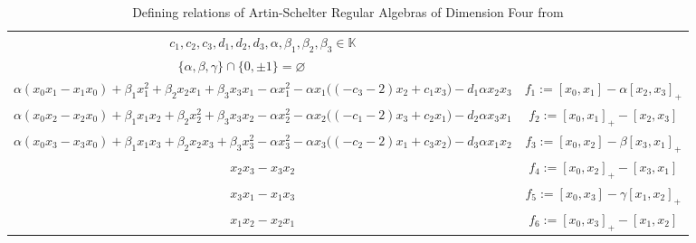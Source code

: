 \documentclass{amsart}
\begin{document}
\begin{table}[H]
{{\begin{tabular}{|c|c|c|}
\multicolumn{2}{|c|}{\small $c_1,c_2,c_3,d_1,d_2,d_3,\alpha, \beta_1, \beta_2, \beta_3 \in \mathbb{K}$}  & 
\shortstack{$\alpha, \beta, \gamma \in \mathbb{K},\ \alpha+ \beta + \gamma +\alpha\beta\gamma = 0,$\\
$\{\alpha, \beta, \gamma\} \cap \{0, \pm1\} = \varnothing$} \\
\hline
\multicolumn{2}{|c|}{\footnotesize $\alpha(x_0 x_1 - x_1 x_0) + \beta_1 x_1^2 + \beta_2 x_2 x_1 + \beta_3 x_3 x_1 
- \alpha x_1^2 - \alpha x_1 \big( (-c_3 - 2)x_2 + c_1 x_3 \big) - d_1 \alpha x_2 x_3 $} & $f_1 := [x_0, x_1] - \alpha [x_2, x_3]_+$ \\
\multicolumn{2}{|c|}{\footnotesize $\alpha(x_0 x_2 - x_2 x_0) + \beta_1 x_1 x_2 + \beta_2 x_2^2 + \beta_3 x_3 x_2 
- \alpha x_2^2 - \alpha x_2 \big( (-c_1 - 2)x_3 + c_2 x_1 \big) - d_2 \alpha x_3 x_1$} & $f_2 := [x_0, x_1]_+ - [x_2, x_3]$ \\
\multicolumn{2}{|c|}{\footnotesize $\alpha(x_0 x_3 - x_3 x_0) + \beta_1 x_1 x_3 + \beta_2 x_2 x_3 + \beta_3 x_3^2 
- \alpha x_3^2 - \alpha x_3 \big( (-c_2 - 2)x_1 + c_3 x_2 \big) - d_3 \alpha x_1 x_2$} & $f_3 := [x_0, x_2] - \beta [x_3, x_1]_+$ \\
\multicolumn{2}{|c|}{$x_2 x_3 - x_3 x_2$} & $f_4 := [x_0, x_2]_+ - [x_3, x_1]$ \\
\multicolumn{2}{|c|}{$x_3 x_1 - x_1 x_3$} & $f_5 := [x_0, x_3] - \gamma [x_1, x_2]_+$ \\
\multicolumn{2}{|c|}{\small $x_1 x_2 - x_2 x_1$} & $f_6 := [x_0, x_3]_+ - [x_1, x_2]$ \\
\hline
\end{tabular}
}}
\caption{Defining relations of Artin-Schelter Regular Algebras of Dimension Four from \cite{MR2529094, grimley2016hochschild, 10.1112/jlms/jdp057, MR1429334, Pym2013PoissonSA, Smith1992}}
\end{table}
\end{document}
